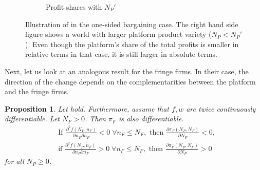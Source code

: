 \documentclass[a4paper]{article}
\newtheorem{proposition}{Proposition}
\begin{document}
\begin{figure}[ht]
\begin{subfigure}[b]{0.45\textwidth}
        \caption{Profit shares with $N_P'$}
    \end{subfigure}
    \caption{Illustration of  in the one-sided bargaining case. The right hand side figure shows a world with larger platform product variety ($N_P < N_P'$). Even though the platform's share of the total profits is smaller in relative terms in that case, it is still larger in absolute terms.}
    \label{fig:increase_N_P_platform}
\end{figure}

Next, let us look at an analogous result for the fringe firms.
In their case, the direction of the change depends on the complementarities between the platform and the fringe firms.
\begin{proposition}
    \label{prop:share_of_fringe}
    Let  hold.
    Furthermore, assume that $f, w$ are twice continuously differentiable.
    Let $N_F > 0$.
    Then $\pi_F$ is also differentiable.
    \begin{align*}
        &\text{If } \frac{\partial^2 f(N_P, n_F)}{\partial n_P \partial n_F} < 0 \;\forall n_F \leq N_F, \text{ then } \frac{\partial \pi_F(N_P, N_F)}{\partial N_P} < 0, \\
        &\text{if } \frac{\partial^2 f(N_P, n_F)}{\partial n_P \partial n_F} > 0 \;\forall n_F \leq N_F, \text{ then } \frac{\partial \pi_F(N_P, N_F)}{\partial N_P} > 0
    \end{align*}
    for all $N_P \geq 0$.
\end{proposition}
\end{document}
